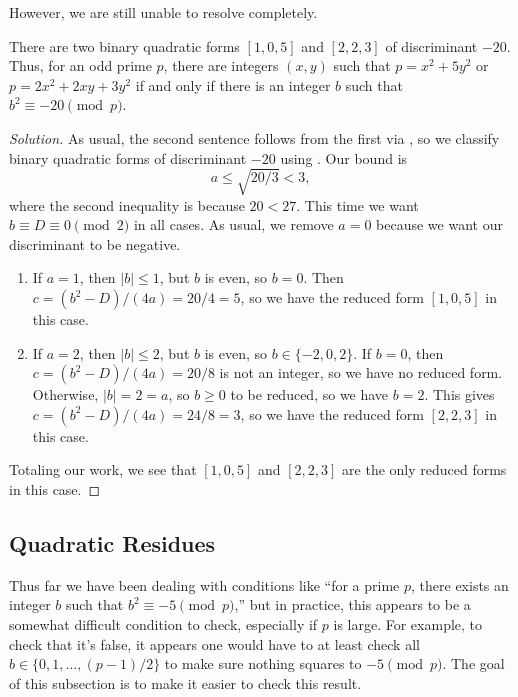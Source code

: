 \documentclass[../notes.tex]{subfiles}
\begin{document}
However, we are still unable to resolve  completely.
\begin{example} \label{ex:almost-full-primes-of-form-5}
	There are two binary quadratic forms $[1,0,5]$ and $[2,2,3]$ of discriminant $-20$. Thus, for an odd prime $p$, there are integers $(x,y)$ such that $p=x^2+5y^2$ or $p=2x^2+2xy+3y^2$ if and only if there is an integer $b$ such that $b^2\equiv-20\pmod p$.
\end{example}
\begin{proof}[Solution]
	As usual, the second sentence follows from the first via , so we classify binary quad\-ratic forms of discriminant $-20$ using . Our bound is
	\[a\le\sqrt{20/3}<3,\]
	where the second inequality is because $20<27$. This time we want $b\equiv D\equiv0\pmod2$ in all cases. As usual, we remove $a=0$ because we want our discriminant to be negative.
	\begin{enumerate}
		\item If $a=1$, then $\left|b\right|\le1$, but $b$ is even, so $b=0$. Then $c=\left(b^2-D\right)/(4a)=20/4=5$, so we have the reduced form $[1,0,5]$ in this case.
		\item If $a=2$, then $\left|b\right|\le2$, but $b$ is even, so $b\in\{-2,0,2\}$. If $b=0$, then $c=\left(b^2-D\right)/(4a)=20/8$ is not an integer, so we have no reduced form. Otherwise, $\left|b\right|=2=a$, so $b\ge0$ to be reduced, so we have $b=2$. This gives $c=\left(b^2-D\right)/(4a)=24/8=3$, so we have the reduced form $[2,2,3]$ in this case.
	\end{enumerate}
	Totaling our work, we see that $[1,0,5]$ and $[2,2,3]$ are the only reduced forms in this case.
\end{proof}

\subsection{Quadratic Residues}
Thus far we have been dealing with conditions like ``for a prime $p$, there exists an integer $b$ such that $b^2\equiv-5\pmod p$,'' but in practice, this appears to be a somewhat difficult condition to check, especially if $p$ is large. For example, to check that it's false, it appears one would have to at least check all $b\in\{0,1,\ldots,(p-1)/2\}$ to make sure nothing squares to $-5\pmod p$. The goal of this subsection is to make it easier to check this result.
\end{document}
